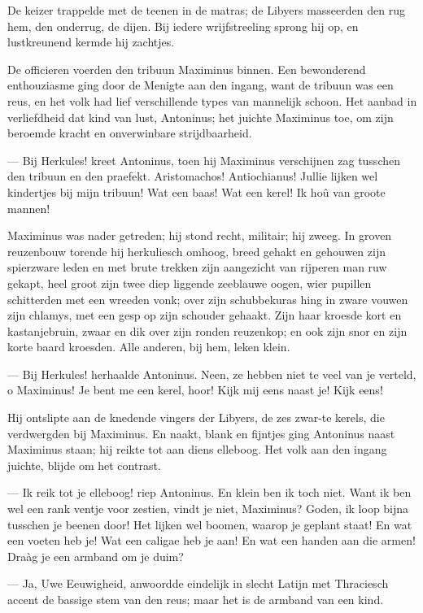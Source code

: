 \documentclass[a4paper, 12pt, oneside, dutch]{article}
\begin{document}
De keizer trappelde met de teenen in de matras; de Libyers masseerden den rug hem, den onderrug, de dijen. Bij iedere wrijfstreeling sprong hij op, en lustkreunend kermde hij zachtjes.

De officieren voerden den tribuun Maximinus binnen. Een bewonderend enthouziasme ging door de Menigte aan den ingang, want de tribuun was een reus, en het volk had lief verschillende types van mannelijk schoon. Het aanbad in verliefdheid dat kind van lust, Antoninus; het juichte Maximinus toe, om zijn beroemde kracht en onverwinbare strijdbaarheid.

--- Bij Herkules! kreet Antoninus, toen hij Maximinus verschijnen zag tusschen den tribuun en den praefekt. Aristomachos! Antiochianus! Jullie lijken wel kindertjes bij mijn tribuun! Wat een baas! Wat een kerel! Ik hoû van groote mannen!

Maximinus was nader getreden; hij stond recht, militair; hij zweeg. In groven reuzenbouw torende hij herkuliesch omhoog, breed gehakt en gehouwen zijn spierzware leden en met brute trekken zijn aangezicht van rijperen man ruw gekapt, heel groot zijn twee diep liggende zeeblauwe oogen, wier pupillen schitterden met een wreeden vonk; over zijn schubbekuras hing in zware vouwen zijn chlamys, met een gesp op zijn schouder gehaakt. Zijn haar kroesde kort en kastanjebruin, zwaar en dik over zijn ronden reuzenkop; en ook zijn snor en zijn korte baard kroesden. Alle anderen, bij hem, leken klein.

--- Bij Herkules! herhaalde Antoninus. Neen, ze hebben niet te veel van je verteld, o Maximinus! Je bent me een kerel, hoor! Kijk mij eens naast je! Kijk eens!

Hij ontslipte aan de knedende vingers der Libyers, de zes zwar-te kerels, die verdwergden bij Maximinus. En naakt, blank en fijntjes ging Antoninus naast Maximinus staan; hij reikte tot aan diens elleboog. Het volk aan den ingang juichte, blijde om het contrast.

--- Ik reik tot je elleboog! riep Antoninus. En klein ben ik toch niet. Want ik ben wel een rank ventje voor zestien, vindt je niet, Maximinus? Goden, ik loop bijna tusschen je beenen door! Het lijken wel boomen, waarop je geplant staat! En wat een voeten heb je! Wat een caligae heb je aan! En wat een handen aan die armen! Draàg je een armband om je duim?

--- Ja, Uwe Eeuwigheid, anwoordde eindelijk in slecht Latijn met Thraciesch accent de bassige stem van den reus; maar het is de armband van een kind.
\end{document}
